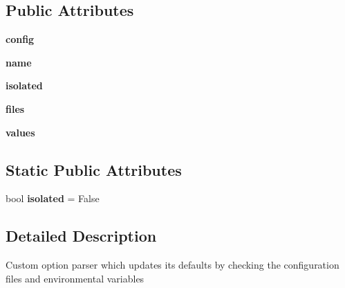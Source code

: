 \subsection*{Public Attributes}
\begin{DoxyCompactItemize}
\item 
\mbox{\label{classpip_1_1baseparser_1_1_config_option_parser_a6bd5f65a9dea9d3d122259782002df2d}} 
{\bfseries config}
\item 
\mbox{\label{classpip_1_1baseparser_1_1_config_option_parser_ae15dc060b8a45a3750b6c659a2cfc523}} 
{\bfseries name}
\item 
\mbox{\label{classpip_1_1baseparser_1_1_config_option_parser_ab9ba7e08764f689a6c211fcee92d983d}} 
{\bfseries isolated}
\item 
\mbox{\label{classpip_1_1baseparser_1_1_config_option_parser_ab7d3287d254043e808aa4047a1b454da}} 
{\bfseries files}
\item 
\mbox{\label{classpip_1_1baseparser_1_1_config_option_parser_a436be8961b32e006d82b6201ceb2527a}} 
{\bfseries values}
\end{DoxyCompactItemize}
\subsection*{Static Public Attributes}
\begin{DoxyCompactItemize}
\item 
\mbox{\label{classpip_1_1baseparser_1_1_config_option_parser_ae9cbd8b46812184ae559a00c74291ffd}} 
bool {\bfseries isolated} = False
\end{DoxyCompactItemize}


\subsection{Detailed Description}
\begin{DoxyVerb}Custom option parser which updates its defaults by checking the
configuration files and environmental variables\end{DoxyVerb}
 

